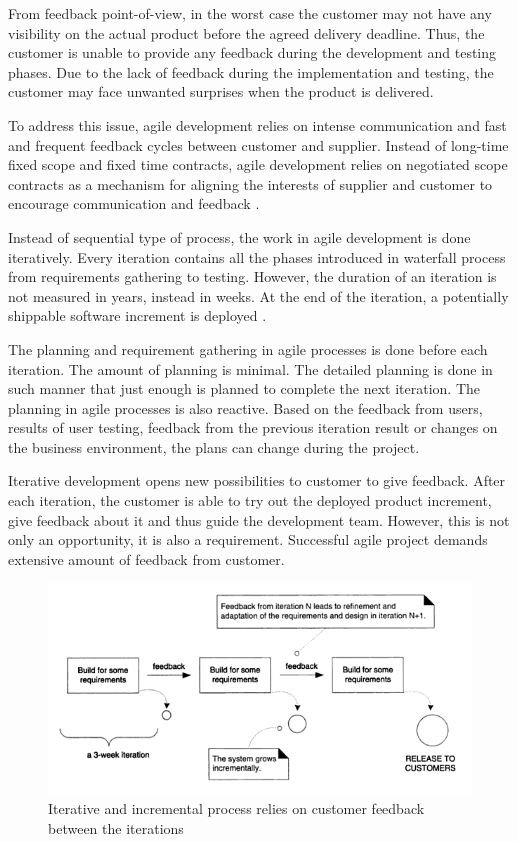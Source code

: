 \documentclass[english,12pt,a4paper,pdftex]{article}
\begin{document}
From feedback point-of-view, in the worst case the customer may not have any visibility on the actual product before the agreed delivery deadline. Thus, the customer is unable to provide any feedback during the development and testing phases. Due to the lack of feedback during the implementation and testing, the customer may face unwanted surprises when the product is delivered.

To address this issue, agile development relies on intense communication and fast and frequent feedback cycles between customer and supplier. Instead of long-time fixed scope and fixed time contracts, agile development relies on negotiated scope contracts as a mechanism for aligning the interests of supplier and customer to encourage communication and feedback \citep{beck2004}.

Instead of sequential type of process, the work in agile development is done iteratively. Every iteration contains all the phases introduced in waterfall process from requirements gathering to testing. However, the duration of an iteration is not measured in years, instead in weeks. At the end of the iteration, a potentially shippable software increment is deployed \citep{shore2007}.

The planning and requirement gathering in agile processes is done before each iteration. The amount of planning is minimal. The detailed planning is done in such manner that just enough is planned to complete the next iteration. The planning in agile processes is also reactive. Based on the feedback from users, results of user testing, feedback from the previous iteration result or changes on the business environment, the plans can change during the project. 

Iterative development opens new possibilities to customer to give feedback. After each iteration, the customer is able to try out the deployed product increment, give feedback about it and thus guide the development team. However, this is not only an opportunity, it is also a requirement. Successful agile project demands extensive amount of feedback from customer.

\begin{figure}[htb]
\begin{center}
\includegraphics[width=1.0\textwidth]{iterative_and_incremental.png}
\end{center}
\caption{Iterative and incremental process relies on customer feedback between the iterations \citep{larman2004}}
\label{fig:iterative_and_incremental}
\end{figure}
\end{document}

